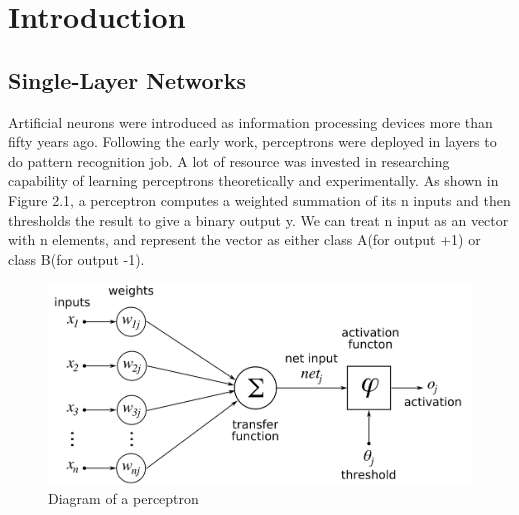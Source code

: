 
\chapter{Introduction} %
\label{Chapter2}


\section{Single-Layer Networks}

Artificial neurons were introduced as information processing devices more than fifty years ago\citep{mcculloch1943logical}. Following the early work, perceptrons were deployed in layers to do pattern recognition job. A lot of resource was invested in researching capability of learning perceptrons theoretically and experimentally. As shown in Figure 2.1, a perceptron computes a weighted summation of its n inputs and then thresholds the result to give a binary output y. We can treat n input as an vector with n elements, and represent the vector as either class A(for output +1) or class B(for output -1).
\graphicspath{ {./Figures/} }
\begin{figure}
\begin{center}
   \includegraphics[width=0.8\linewidth]{Figure2-1.png}

\end{center}
   \caption{Diagram of a perceptron}
\label{fig:long}
\label{fig:onecol}
\end{figure}

